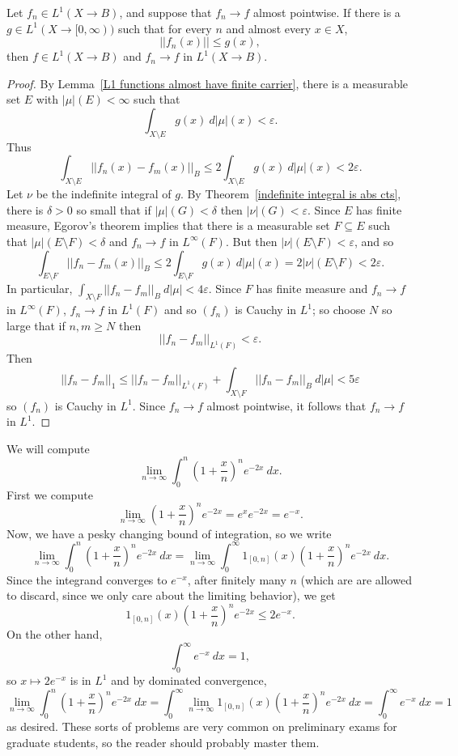\begin{theorem}
Let $f_{n} \in L^1(X \to B)$, and suppose that $f_{n} \to f$ almost pointwise. If there is a $g \in L^1(X \to [0, \infty))$ such that for every $n$ and almost every $x \in X$,
\[||f_{n}(x)|| \leq g(x),\]
then $f \in L^1(X \to B)$ and $f_{n} \to f$ in $L^1(X \to B)$.
\end{theorem}
\begin{proof}
By Lemma~\ref{L1 functions almost have finite carrier}, there is a measurable set $E$ with $|\mu|(E) < \infty$ such that
\[\int_{X \setminus E} g(x) ~d|\mu|(x) < \varepsilon.\]
Thus
\[\int_{X \setminus E} ||f_{n}(x) - f_{m}(x)||_{B} \leq 2\int_{X \setminus E} g(x) ~d|\mu|(x) < 2\varepsilon.\]
Let $\nu$ be the indefinite integral of $g$.
By Theorem~\ref{indefinite integral is abs cts}, there is $\delta > 0$ so small that if $|\mu|(G) < \delta$ then $|\nu|(G) < \varepsilon$.
Since $E$ has finite measure, Egorov's theorem implies that there is a measurable set $F \subseteq E$ such that $|\mu|(E \setminus F) < \delta$ and $f_{n} \to f$ in $L^\infty(F)$.
But then $|\nu|(E \setminus F) < \varepsilon$, and so
\[\int_{E \setminus F} ||f_{n} - f_{m}(x)||_{B} \leq 2\int_{E \setminus F} g(x) ~d|\mu|(x) = 2|\nu|(E \setminus F) < 2\varepsilon.\]
In particular, $\int_{X \setminus F} ||f_{n} - f_{m}||_{B} ~d|\mu| < 4\varepsilon$.
Since $F$ has finite measure and $f_{n} \to f$ in $L^\infty(F)$, $f_{n} \to f$ in $L^1(F)$ and so $(f_{n})$ is Cauchy in $L^1$; so choose $N$ so large that if $n,m \geq N$ then
\[||f_{n} - f_{m}||_{L^1(F)} < \varepsilon.\]
Then
\[||f_{n} - f_{m}||_1 \leq ||f_{n} - f_{m}||_{L^1(F)} + \int_{X \setminus F} ||f_{n} - f_{m}||_{B} ~d|\mu| < 5\varepsilon\]
so $(f_{n})$ is Cauchy in $L^1$.
Since $f_{n} \to f$ almost pointwise, it follows that $f_{n} \to f$ in $L^1$.
\end{proof}

\begin{example}
We will compute
\[\lim_{n \to \infty} \int_0^{n} \left(1 + \frac{x}{n}\right)^{n} e^{-2x} ~dx.\]
First we compute
\[\lim_{n \to \infty} \left(1 + \frac{x}{n}\right)^{n} e^{-2x} = e^{x} e^{-2x} = e^{-x}.\]
Now, we have a pesky changing bound of integration, so we write
\[\lim_{n \to \infty} \int_0^{n} \left(1 + \frac{x}{n}\right)^{n} e^{-2x} ~dx = \lim_{n \to \infty} \int_0^{\infty} 1_{[0, n]}(x) \left(1 + \frac{x}{n}\right)^{n} e^{-2x} ~dx.\]
Since the integrand converges to $e^{-x}$, after finitely many $n$ (which are are allowed to discard, since we only care about the limiting behavior), we get
\[1_{[0, n]}(x) \left(1 + \frac{x}{n}\right)^{n} e^{-2x} \leq 2e^{-x}.\]
On the other hand,
\[\int_0^{\infty} e^{-x} ~dx = 1,\]
so $x \mapsto 2e^{-x}$ is in $L^1$ and by dominated convergence,
\[\lim_{n \to \infty} \int_0^{n} \left(1 + \frac{x}{n}\right)^{n} e^{-2x} ~dx = \int_0^{\infty} \lim_{n \to \infty} 1_{[0, n]}(x) \left(1 + \frac{x}{n}\right)^{n} e^{-2x} ~dx = \int_0^{\infty} e^{-x} ~dx = 1\]
as desired.
These sorts of problems are very common on preliminary exams for graduate students, so the reader should probably master them.
\end{example}

